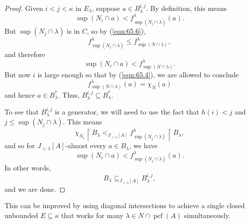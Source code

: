 \documentclass[10pt]{amsart}
\theoremstyle{plain}
\theoremstyle{definition}
\theoremstyle{remark}
\DeclareMathOperator{\pcf}{pcf}
\numberwithin{equation}{section}
\begin{document}
\begin{proof}
Given $i<j<\kappa$ in $E_\lambda$, suppose $a\in B^{i,j}_\lambda$.  By definition, this means
\begin{equation}
\sup(N_i\cap a)< f^\lambda_{\sup(N_j\cap\lambda)}(a).
\end{equation}
But $\sup(N_j\cap\lambda)$ is in $C$, so by (\ref{eqn:65.6}),
\begin{equation}
f^\lambda_{\sup(N_j\cap\lambda)}\leq f^\lambda_{\sup(N\cap\lambda)},
\end{equation}
and therefore
\begin{equation}
\sup(N_i\cap a)< f^\lambda_{\sup(N\cap\lambda)}.
\end{equation}
But now $i$ is large enough so that by (\ref{eqn:65.4}), we are allowed to conclude
\begin{equation}
f^\lambda_{\sup(N\cap\lambda)}(a) = \chi_N(a)
\end{equation}
and hence $a\in B^*_\lambda$.  Thus, $B^{i, j}_\lambda\subseteq B^*_\lambda$.

To see that $B^{i, j}_\lambda$ is a generator, we will need to use the fact that $h(i)<j$ and $j\leq\sup(N_j\cap\lambda)$.  This means
\begin{equation}
\chi_{N_i}\restriction B_\lambda <_{J_{<\lambda}[A]} f^\lambda_{\sup(N_j\cap\lambda)}\restriction B_\lambda,
\end{equation}
and so for $J_{<\lambda}[A]$-almost every $a\in B_\lambda$, we have
\begin{equation}
\sup(N_i\cap a)< f^\lambda_{\sup(N_j\cap\lambda)}(a).
\end{equation}
In other words,
\begin{equation}
B_\lambda\subseteq_{J_{<\lambda}[A]}B^{i, j}_\lambda,
\end{equation}
and we are done.
\end{proof}

This can be improved by using diagonal intersections to achieve a single closed unbounded $E\subseteq\kappa$ that works
for many $\lambda\in N\cap\pcf(A)$ simultaneously.
\end{document}
